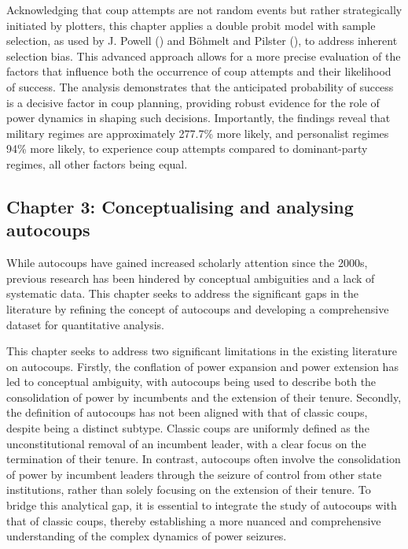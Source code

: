 \documentclass[
  12pt,
]{report}
\begin{document}
Acknowledging that coup attempts are not random events but rather
strategically initiated by plotters, this chapter applies a double
probit model with sample selection, as used by J. Powell
() and Böhmelt and Pilster
(), to address inherent selection
bias. This advanced approach allows for a more precise evaluation of the
factors that influence both the occurrence of coup attempts and their
likelihood of success. The analysis demonstrates that the anticipated
probability of success is a decisive factor in coup planning, providing
robust evidence for the role of power dynamics in shaping such
decisions. Importantly, the findings reveal that military regimes are
approximately 277.7\% more likely, and personalist regimes 94\% more
likely, to experience coup attempts compared to dominant-party regimes,
all other factors being equal.

\subsection*{Chapter 3: Conceptualising and analysing
autocoups}\label{chapter-3-conceptualising-and-analysing-autocoups}

While autocoups have gained increased scholarly attention since the
2000s, previous research has been hindered by conceptual ambiguities and
a lack of systematic data. This chapter seeks to address the significant
gaps in the literature by refining the concept of autocoups and
developing a comprehensive dataset for quantitative analysis.

This chapter seeks to address two significant limitations in the
existing literature on autocoups. Firstly, the conflation of power
expansion and power extension has led to conceptual ambiguity, with
autocoups being used to describe both the consolidation of power by
incumbents and the extension of their tenure. Secondly, the definition
of autocoups has not been aligned with that of classic coups, despite
being a distinct subtype. Classic coups are uniformly defined as the
unconstitutional removal of an incumbent leader, with a clear focus on
the termination of their tenure. In contrast, autocoups often involve
the consolidation of power by incumbent leaders through the seizure of
control from other state institutions, rather than solely focusing on
the extension of their tenure. To bridge this analytical gap, it is
essential to integrate the study of autocoups with that of classic
coups, thereby establishing a more nuanced and comprehensive
understanding of the complex dynamics of power seizures.
\end{document}
